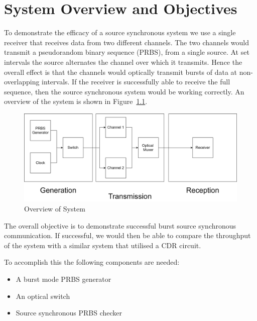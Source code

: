 \chapter{System Overview and Objectives}
To demonstrate the efficacy of a source synchronous system we use a single
receiver that receives data from two different channels.  The two channels
would transmit a pseudorandom binary sequence (PRBS), from a single source. At
set intervals the source alternates the channel over which it transmits.  Hence
the overall effect is that the channels would optically transmit bursts of data
at non-overlapping intervals. If the receiver is successfully able to receive
the full sequence, then the source synchronous system would be working
correctly.  An overview of the system is shown in
Figure~\ref{fig:overview}. 

\begin{figure}[h]
    \centering
    \includegraphics[width=1\linewidth]{img/overview.png}
    \caption{Overview of System}%
    \label{fig:overview}
\end{figure}

The overall objective is to demonstrate successful burst source synchronous
communication.  If successful, we would then be able to compare the throughput
of the system with a similar system that utilised a CDR circuit.

To accomplish this the following components are needed:
\begin{itemize}
    \item A burst mode PRBS generator
    \item An optical switch 
    \item Source synchronous PRBS checker 
\end{itemize}

